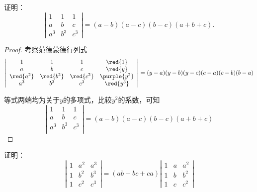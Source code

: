 \begin{li}
  证明：
  $$
  \left|
    \begin{array}{ccc}
      1   &   1   &   1\\
      a   &   b   &   c\\
      a^3 &   b^3 &   c^3
    \end{array}
  \right| = (a-b)(a-c)(b-c)(a+b+c).
  $$
\end{li}

\begin{proof}
考察范德蒙德行列式
$$
\left|
  \begin{array}{cccc}
    1   &   1   &   1   & \red{1}\\
    a   &   b   &   c   & \red{y}\\
    \red{a^2} &   \red{b^2} &   \red{c^2} & \purple{y^2}\\
    a^3 &   b^3 &   c^3 & \red{y^3}\\
  \end{array}
\right|
= (y-a)(y-b)(y-c)(c-a)(c-b)(b-a)
$$

等式两端均为关于$y$的多项式，比较$y^2$的系数，可知
$$
\left|
  \begin{array}{cccc}
    1   &   1   &   1  \\ 
    a   &   b   &   c  \\
    a^3 &   b^3 &   c^3\\
  \end{array}
\right| = (a-b)(a-c)(b-c)(a+b+c)
$$
\end{proof}






\begin{li}
  证明：
  $$
  \left|
    \begin{array}{ccc}
      1&a^2&a^3\\
      1&b^2&b^3\\
      1&c^2&c^3
    \end{array}
  \right| = (ab+bc+ca)\left|
    \begin{array}{ccc}
      1&a&a^2\\
      1&b&b^2\\
      1&c&c^2
    \end{array}
  \right|
  $$
\end{li}

